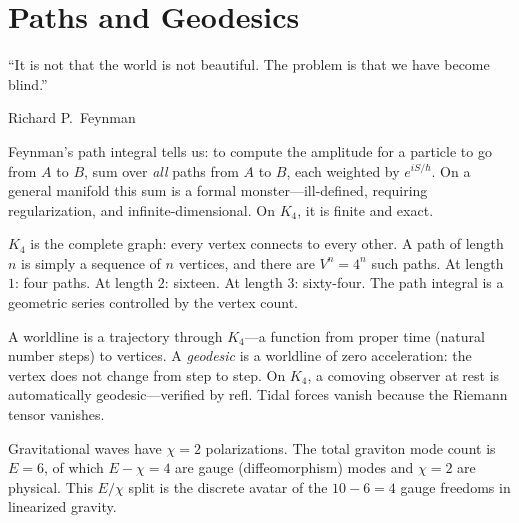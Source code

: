 \documentclass[11pt,a4paper]{book}
\def\texttt#1{#1}%
\begin{document}
\chapter{Paths and Geodesics}
\label{ch:paths-geodesics}

\epigraph{``It is not that the world is not beautiful. The problem is that we have become blind.''}{Richard P.~Feynman}

Feynman's path integral tells us: to compute the amplitude for a particle to go from $A$ to $B$, sum over \emph{all} paths from $A$ to $B$, each weighted by $e^{iS/\hbar}$. On a general manifold this sum is a formal monster---ill-defined, requiring regularization, and infinite-dimensional. On $K_4$, it is finite and exact.

$K_4$ is the complete graph: every vertex connects to every other. A path of length $n$ is simply a sequence of $n$ vertices, and there are $V^n = 4^n$ such paths. At length $1$: four paths. At length $2$: sixteen. At length $3$: sixty-four. The path integral is a geometric series controlled by the vertex count.

A worldline is a trajectory through $K_4$---a function from proper time (natural number steps) to vertices. A \emph{geodesic} is a worldline of zero acceleration: the vertex does not change from step to step. On $K_4$, a comoving observer at rest is automatically geodesic---verified by \texttt{refl}. Tidal forces vanish because the Riemann tensor vanishes.

Gravitational waves have $\chi = 2$ polarizations. The total graviton mode count is $E = 6$, of which $E - \chi = 4$ are gauge (diffeomorphism) modes and $\chi = 2$ are physical. This $E/\chi$ split is the discrete avatar of the $10 - 6 = 4$ gauge freedoms in linearized gravity.

\end{document}
